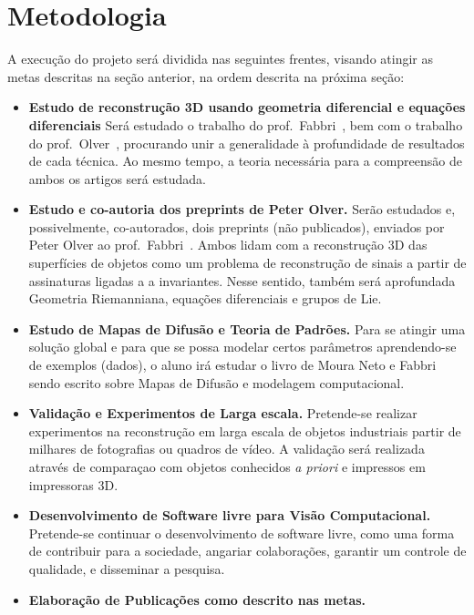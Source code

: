 \documentclass[a4paper,titlepage]{article}
\begin{document}
\section{Metodologia}
A execução do projeto será dividida nas seguintes frentes, visando atingir as
metas descritas na seção anterior, na ordem descrita na próxima seção:
\begin{itemize}
\item \textbf{Estudo de reconstrução 3D usando geometria diferencial e equações
  diferenciais} 
  Será estudado o trabalho do prof.\ Fabbri~\cite{fabbri2016multiview},
  bem com o trabalho do prof.\ Olver~\cite{Kogan:Olver:LobachevskiiJMA2015},
  procurando unir a generalidade à profundidade de resultados de cada técnica.
  Ao mesmo tempo, a teoria necessária para a compreensão de ambos os artigos
  será estudada.
\item \textbf{Estudo e co-autoria dos preprints de Peter Olver.} 
  Serão estudados e, possivelmente, co-autorados, dois preprints (não publicados), enviados por Peter Olver ao
  prof.\ Fabbri~\cite{Olver:Outline:Preprint:2020,Olver:Reprojn:Preprint:2020}. Ambos lidam com a reconstrução 3D das superfícies de objetos
  como um problema de reconstrução de sinais a partir de assinaturas ligadas a
  a invariantes. Nesse sentido, também será aprofundada Geometria Riemanniana,
  equações diferenciais e grupos de Lie.
\item \textbf{Estudo de Mapas de Difusão e Teoria de Padrões.} 
  Para se atingir uma solução global e para que se possa modelar certos
  parâmetros aprendendo-se de exemplos (dados), o aluno irá estudar o livro de
  Moura Neto e Fabbri sendo escrito sobre Mapas de Difusão e modelagem
  computacional.
\item \textbf{Validação e Experimentos de Larga escala.} Pretende-se realizar
experimentos na reconstrução em larga escala de objetos industriais 
partir de milhares de fotografias ou quadros de vídeo. A validação será
realizada através de comparaçao com objetos conhecidos \emph{a priori}
e impressos em impressoras 3D. 
\item \textbf{Desenvolvimento de Software livre para Visão Computacional.}
Pretende-se continuar o desenvolvimento de software livre, como uma
forma de contribuir para a sociedade, angariar colaborações,
garantir um controle de qualidade, e disseminar a pesquisa. 
\item \textbf{Elaboração de Publicações como descrito nas metas.}
\end{itemize}
\end{document}
